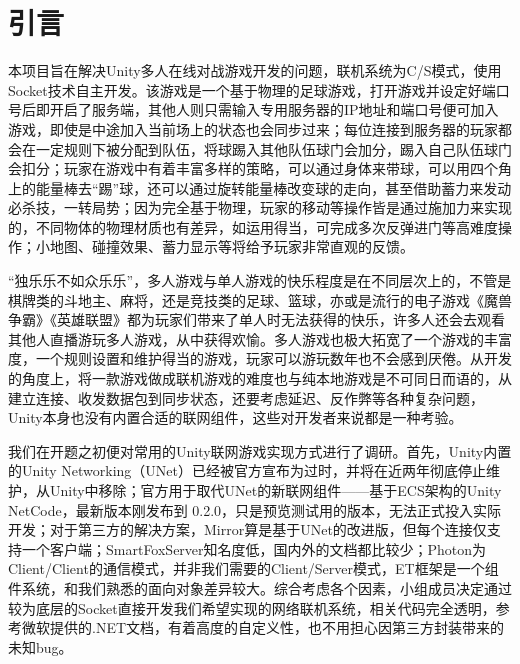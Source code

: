 \documentclass[conference]{IEEEtran}
\begin{document}





\begin{abstract}
论文摘要是对文章内容不加诠释和评论的简单陈述。一般控制在 200 字左右，建议在论文全部完成后再动手写摘要。
\end{abstract}


\section{引言}

本项目旨在解决Unity多人在线对战游戏开发的问题，联机系统为C/S模式，使用Socket技术自主开发。该游戏是一个基于物理的足球游戏，打开游戏并设定好端口号后即开启了服务端，其他人则只需输入专用服务器的IP地址和端口号便可加入游戏，即使是中途加入当前场上的状态也会同步过来；每位连接到服务器的玩家都会在一定规则下被分配到队伍，将球踢入其他队伍球门会加分，踢入自己队伍球门会扣分；玩家在游戏中有着丰富多样的策略，可以通过身体来带球，可以用四个角上的能量棒去“踢”球，还可以通过旋转能量棒改变球的走向，甚至借助蓄力来发动必杀技，一转局势；因为完全基于物理，玩家的移动等操作皆是通过施加力来实现的，不同物体的物理材质也有差异，如运用得当，可完成多次反弹进门等高难度操作；小地图、碰撞效果、蓄力显示等将给予玩家非常直观的反馈。

“独乐乐不如众乐乐”，多人游戏与单人游戏的快乐程度是在不同层次上的，不管是棋牌类的斗地主、麻将，还是竞技类的足球、篮球，亦或是流行的电子游戏《魔兽争霸》《英雄联盟》都为玩家们带来了单人时无法获得的快乐，许多人还会去观看其他人直播游玩多人游戏，从中获得欢愉。多人游戏也极大拓宽了一个游戏的丰富度，一个规则设置和维护得当的游戏，玩家可以游玩数年也不会感到厌倦。从开发的角度上，将一款游戏做成联机游戏的难度也与纯本地游戏是不可同日而语的，从建立连接、收发数据包到同步状态，还要考虑延迟、反作弊等各种复杂问题，Unity本身也没有内置合适的联网组件，这些对开发者来说都是一种考验。

我们在开题之初便对常用的Unity联网游戏实现方式进行了调研。首先，Unity内置的Unity Networking（UNet）已经被官方宣布为过时，并将在近两年彻底停止维护，从Unity中移除\cite{UNet过时}；官方用于取代UNet的新联网组件——基于ECS架构的Unity NetCode，最新版本刚发布到 0.2.0，只是预览测试用的版本，无法正式投入实际开发；对于第三方的解决方案，Mirror算是基于UNet的改进版，但每个连接仅支持一个客户端；SmartFoxServer知名度低，国内外的文档都比较少；Photon为Client/Client的通信模式，并非我们需要的Client/Server模式\cite{优缺点比较}，ET框架是一个组件系统，和我们熟悉的面向对象差异较大。综合考虑各个因素，小组成员决定通过较为底层的Socket直接开发我们希望实现的网络联机系统，相关代码完全透明，参考微软提供的.NET文档，有着高度的自定义性，也不用担心因第三方封装带来的未知bug。
\end{document}
